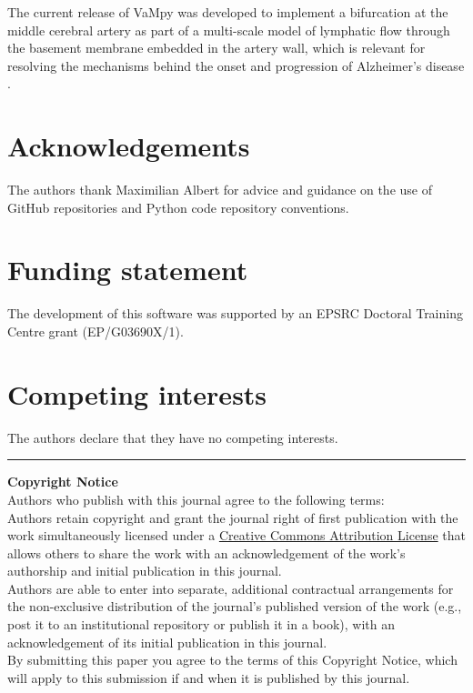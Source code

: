 \documentclass{jors}
\begin{document}
The current release of VaMpy was developed to implement a bifurcation at the middle cerebral artery as part of a multi-scale model of lymphatic flow through the basement membrane embedded in the artery wall, which is relevant for resolving the mechanisms behind the onset and progression of Alzheimer's disease \cite{Diem2016a,Bakker2016}.

\section*{Acknowledgements}

The authors thank Maximilian Albert for advice and guidance on the use of GitHub repositories and Python code repository conventions.

\section*{Funding statement}

The development of this software was supported by an EPSRC Doctoral Training Centre grant (EP/G03690X/1).

\section*{Competing interests}

The authors declare that they have no competing interests.

\printbibliography

\vspace{2cm}

\rule{\textwidth}{1pt}

{ \bf Copyright Notice} \\
Authors who publish with this journal agree to the following terms: \\

Authors retain copyright and grant the journal right of first publication with the work simultaneously licensed under a  \href{http://creativecommons.org/licenses/by/3.0/}{Creative Commons Attribution License} that allows others to share the work with an acknowledgement of the work's authorship and initial publication in this journal. \\

Authors are able to enter into separate, additional contractual arrangements for the non-exclusive distribution of the journal's published version of the work (e.g., post it to an institutional repository or publish it in a book), with an acknowledgement of its initial publication in this journal. \\

By submitting this paper you agree to the terms of this Copyright Notice, which will apply to this submission if and when it is published by this journal.
\end{document}
